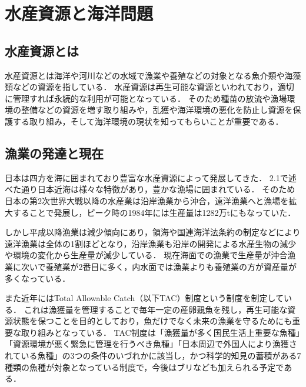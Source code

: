 \documentclass[12pt,a4j,titlepage]{ltjsarticle}
\begin{document}
\clearpage

\section{水産資源と海洋問題}\label{水産資源と海洋問題}

\subsection{水産資源とは}
水産資源とは海洋や河川などの水域で漁業や養殖などの対象となる魚介類や海藻類などの資源を指している．
水産資源は再生可能な資源といわれており，適切に管理すれば永続的な利用が可能となっている\cite{suisanntyou}．
そのため種苗の放流や漁場環境の整備などの資源を増す取り組みや，乱獲や海洋環境の悪化を防止し資源を保護する取り組み，そして海洋環境の現状を知ってもらいことが重要である．
\subsection{漁業の発達と現在}
日本は四方を海に囲まれており豊富な水産資源によって発展してきた．
2.1で述べた通り日本近海は様々な特徴があり，豊かな漁場に囲まれている．
そのため日本の第2次世界大戦以降の水産業は沿岸漁業から沖合，遠洋漁業へと漁場を拡大することで発展し，ピーク時の1984年には生産量は1282万tにもなっていた．\par
しかし平成以降漁業は減少傾向にあり，領海や国連海洋法条約の制定などにより遠洋漁業は全体の1割ほどとなり，沿岸漁業も沿岸の開発による水産生物の減少や環境の変化から生産量が減少している．
現在海面での漁業で生産量が沖合漁業に次いで養殖業が2番目に多く，内水面では漁業よりも養殖業の方が資産量が多くなっている．\par
また近年にはTotal Allowable Catch（以下TAC）制度という制度を制定している．
これは漁獲量を管理することで毎年一定の産卵親魚を残し，再生可能な資源状態を保つことを目的としており，魚だけでなく未来の漁業を守るためにも重要な取り組みとなっている\cite{TAC}．
TAC制度は「漁獲量が多く国民生活上重要な魚種」「資源環境が悪く緊急に管理を行うべき魚種」「日本周辺で外国人により漁獲されている魚種」の3つの条件のいづれかに該当し，かつ科学的知見の蓄積がある7種類の魚種が対象となっている制度で，今後はブリなども加えられる予定である．\par
\end{document}
